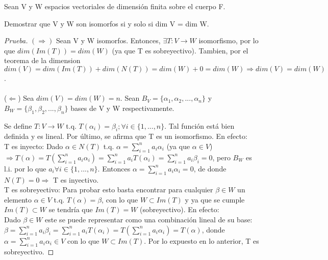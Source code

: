 \documentclass[12pt]{article}
\newenvironment{problem}[2][Problem]{\begin{trivlist}
\item[\hskip \labelsep {\bfseries #1}\hskip \labelsep {\bfseries #2.}]}{\end{trivlist}}
\begin{document}
\begin{problem}{3}
Sean V y W espacios vectoriales de dimensión finita sobre el cuerpo F.
\end{problem}

\begin{problem}{3.1}
Demostrar que V y W son isomorfos si y solo si dim V = dim W.
\end{problem}

\begin{proof} [Prueba]
$(\Rightarrow)$ Sean V y W isomorfos. Entonces, $\exists T:V\longrightarrow W$ isomorfismo, por lo que $dim(Im(T))=dim(W)$ (ya que T es sobreyectivo). Tambien, por el teorema de la dimension $dim(V)=dim(Im(T))+dim(N(T))=dim(W)+0=dim(W) \Longrightarrow dim(V)=dim(W)$.\\
\\
($\Leftarrow$) Sea $dim(V)=dim(W)=n$. Sean $B_V=\{\alpha_{1}, \alpha_{2}, ..., \alpha_{n}\}$ y $B_W=\{\beta_{1}, \beta_{2}, ..., \beta_{n}\}$ bases de V y W respectivamente. 

Se define $T:V \longrightarrow W$ t.q. $T(\alpha_{i})=\beta_{i}; \forall i \in \{1,...,n\}$. Tal función está bien definida y es lineal. Por último, se afirma que T es un isomorfismo. En efecto:\\
T es inyecto: Dado $\alpha \in N(T)$ t.q. $\alpha=\sum_{i=1}^{n}a_{i}\alpha_{i}$ (ya que $\alpha \in V$) $\Longrightarrow T(\alpha)=T(\sum_{i=1}^{n}a_{i}\alpha_{i})=\sum_{i=1}^{n}a_{i}T(\alpha_{i})=\sum_{i=1}^{n}a_{i}\beta_{i} = 0$, pero $B_W$ es l.i. por lo que $a_{i} \forall i \in \{1,...,n\}$. Entonces $\alpha=\sum_{i=1}^{n}a_{i}\alpha_{i}=0$, de donde $N(T)={0} \Longrightarrow$ T es inyectivo.\\
T es sobreyectivo: Para probar esto basta encontrar para cualquier $\beta \in W$ un elemento $\alpha \in V$ t.q. $T(\alpha)=\beta$, con lo que $W \subset Im(T)$ y ya que se cumple $Im(T) \subset W$ se tendría que $Im(T) = W$ (sobreyectivo). En efecto:\\
Dado $\beta \in W$ este se puede representar como una combinación lineal de su base: $\beta = \sum_{i=1}^{n}a_{i}\beta_{i}=\sum_{i=1}^{n}a_{i}T(\alpha_{i})= T(\sum_{i=1}^{n}a_{i}\alpha_{i})=T(\alpha)$, donde $\alpha=\sum_{i=1}^{n}a_{i}\alpha_{i} \in V$ con lo que $W \subset Im(T)$. Por lo expuesto en lo anterior, T es sobreyectivo.
\end{proof}
\end{document}
